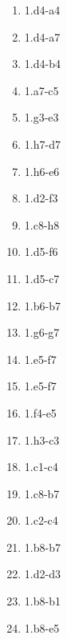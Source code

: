 \begin{enumerate}
\setcounter{enumi}{\value{d_counter}}
\item 1.\queen{}d4-a4\mate{}
\item 1.\queen{}d4-a7\mate{}
\item 1.\queen{}d4-b4\mate{}
\item 1.\queen{}a7-c5\mate{}
\item 1.\queen{}g3-e3\mate{}
\item 1.\rook{}h7-d7\mate{}

\item 1.\rook{}h6-e6\mate{}
\item 1.\knight{}d2-f3\mate{}
\item 1.\queen{}c8-h8\mate{}
\item 1.\knight{}d5-f6\mate{}
\item 1.\knight{}d5-c7\mate{}
\item 1.\pawn{}b6-b7\mate{}

\item 1.\pawn{}g6-g7\mate{}
\item 1.\knight{}e5-f7\mate{}
\item 1.\knight{}e5-f7\mate{}
\item 1.\bishop{}f4-e5\mate{}
\item 1.\queen{}h3-c3\mate{}
\item 1.\rook{}c1-c4\mate{}

\item 1.\bishop{}c8-b7\mate{}
\item 1.\queen{}c2-c4\mate{}
\item 1.\queen{}b8-b7\mate{}
\item 1.\pawn{}d2-d3\mate{}
\item 1.\queen{}b8-b1\mate{}
\item 1.\queen{}b8-e5\mate{}
\setcounter{d_counter}{\value{enumi}}
\end{enumerate}